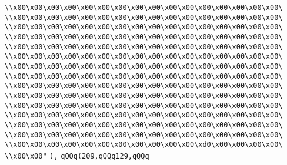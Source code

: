 \verb|\\x00\x00\x00\x00\x00\x00\x00\x00\x00\x00\x00\x00\x00\x00\x00\x00\|\newline
\verb|\\x00\x00\x00\x00\x00\x00\x00\x00\x00\x00\x00\x00\x00\x00\x00\x00\|\newline
\verb|\\x00\x00\x00\x00\x00\x00\x00\x00\x00\x00\x00\x00\x00\x00\x00\x00\|\newline
\verb|\\x00\x00\x00\x00\x00\x00\x00\x00\x00\x00\x00\x00\x00\x00\x00\x00\|\newline
\verb|\\x00\x00\x00\x00\x00\x00\x00\x00\x00\x00\x00\x00\x00\x00\x00\x00\|\newline
\verb|\\x00\x00\x00\x00\x00\x00\x00\x00\x00\x00\x00\x00\x00\x00\x00\x00\|\newline
\verb|\\x00\x00\x00\x00\x00\x00\x00\x00\x00\x00\x00\x00\x00\x00\x00\x00\|\newline
\verb|\\x00\x00\x00\x00\x00\x00\x00\x00\x00\x00\x00\x00\x00\x00\x00\x00\|\newline
\verb|\\x00\x00\x00\x00\x00\x00\x00\x00\x00\x00\x00\x00\x00\x00\x00\x00\|\newline
\verb|\\x00\x00\x00\x00\x00\x00\x00\x00\x00\x00\x00\x00\x00\x00\x00\x00\|\newline
\verb|\\x00\x00\x00\x00\x00\x00\x00\x00\x00\x00\x00\x00\x00\x00\x00\x00\|\newline
\verb|\\x00\x00\x00\x00\x00\x00\x00\x00\x00\x00\x00\x00\x00\x00\x00\x00\|\newline
\verb|\\x00\x00\x00\x00\x00\x00\x00\x00\x00\x00\x00\x00\x00\x00\x00\x00\|\newline
\verb|\\x00\x00\x00\x00\x00\x00\x00\x00\x00\x00\x00\x00\x00\x00\x00\x00\|\newline
\verb|\\x00\x00\x00\x00\x00\x00\x00\x00\x00\x00\x00\xd0\x00\x00\x00\x00\|\newline
\verb|\\x00\x00"|\newline
\verb|),|\newline
\verb|qQQq(209,qQQq129,qQQq|\newline
